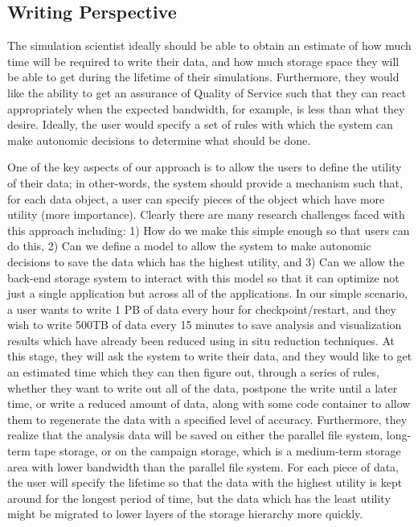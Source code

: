 \subsection{Writing Perspective}
\label{subsec:sim-perspective}
The simulation scientist ideally should be able to
obtain an estimate of how much time will be required to write their data,
and how much storage space they will be able to get during the lifetime of
their simulations. Furthermore, they would like the ability to get an assurance
of Quality of Service such that they can react appropriately when the
expected bandwidth, for example, is less than what they desire. Ideally, the user
would specify a set of rules with which the system can make autonomic
decisions to determine what should be done.
%

One of the key aspects of our approach is to allow the users to define the
utility of their data; in other-words, the system should provide a
mechanism such that, for each data object, a user can specify pieces of the object
which have more utility (more importance).
Clearly there are many research challenges faced with
this approach including: 1) How do we make this simple enough so that users can
do this, 2) Can we define a model to allow the system to make
autonomic decisions to save the data which has the highest utility, and 3) Can
we allow the back-end storage system to interact with this model so that
it can optimize not just a single application but across all of the
applications.
  In our simple scenario, a user wants to write 1 PB of data every hour
for checkpoint/restart, and they wish to write 500TB of data every 15
minutes to save analysis and visualization results which have already been reduced
using in situ reduction techniques. At this stage, they will ask the system to
write their data, and they would like to get an estimated time which they can
then figure out, through a series of rules, whether they want to write out all
of the data, postpone the write until a later time, or write a reduced amount
of data, along with some code
container to allow them to regenerate the data with a specified level of
accuracy.  Furthermore, they realize that the analysis data will be saved on
either the parallel file system, long-term tape storage, or on the campaign storage,
which is a medium-term storage
area with lower bandwidth than the parallel file system.
For each piece of data, the user will specify the lifetime so
that the data with the highest utility is kept around for the longest
period of time, but the data which has the least utility might be migrated to
lower layers of the storage hierarchy more quickly. 

